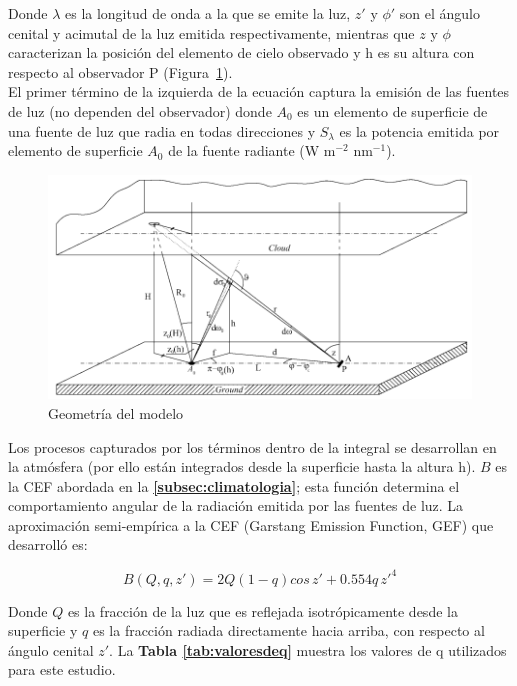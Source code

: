 Donde $\lambda$ es la longitud de onda a la que se emite la luz, $z'$ y $\phi'$ son el ángulo cenital y acimutal de la luz emitida respectivamente, mientras que $z$ y $\phi$ caracterizan la posición del elemento de cielo observado y h es su altura con respecto al observador P (Figura~\ref{geometriamodelo}).\\

El primer término de la izquierda de la ecuación captura la emisión de las fuentes de luz (no dependen del observador) donde $A_{0}$ es un elemento de superficie de una fuente de luz que radia en todas direcciones y $S_{\lambda}$ es la potencia emitida por elemento de superficie $A_{0}$ de la fuente radiante (W m$^{-2}$ nm$^{-1}$).\\


\begin{figure}[htb]
  \centering
    \includegraphics[width=1\textwidth]{geometriamodelo}
  \caption{Geometría del modelo \citep{Kocifaj2007}}
  \label{geometriamodelo}
\end{figure}


Los procesos capturados por los términos dentro de la integral se desarrollan en la atmósfera (por ello están integrados desde la superficie hasta la altura h). $B$ es la CEF abordada en la \textbf{\autoref{subsec:climatologia}}; esta función determina el comportamiento angular de la radiación emitida por las fuentes de luz. La aproximación semi-empírica a la CEF (Garstang Emission Function, GEF) que \cite{Garstang1986} desarrolló es:

\begin{equation}
B(Q, q, z') = 2Q(1-q) cos \, z' + 0.554q \,z'^{4}
\end{equation}

Donde $Q$ es la fracción de la luz que es reflejada isotrópicamente desde la superficie y $q$ es la fracción radiada directamente hacia arriba, con respecto al ángulo cenital $z'$. La \textbf{Tabla \ref{tab:valoresdeq}} muestra los valores de q utilizados para este estudio.\\



